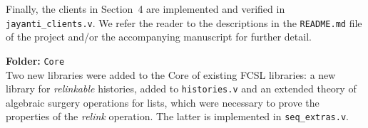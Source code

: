 \documentclass[a4paper,USenglish]{lipics-v2016}
\begin{document}
Finally, the clients in Section~4 are implemented and verified in
\texttt{jayanti\_clients.v}. We refer the reader to the descriptions
in the \texttt{README.md} file of the project and/or the accompanying
manuscript for further detail.

\vspace{.5cm}

{\bf \large Folder:} \texttt{Core}\\

Two new libraries were added to the Core of existing FCSL libraries: a
new library for {\it relinkable} histories, added to
\texttt{histories.v} and an extended theory of algebraic surgery
operations for lists, which were necessary to prove the properties of
the {\it relink} operation. The latter is implemented in
\texttt{seq\_extras.v}.
\end{document}
